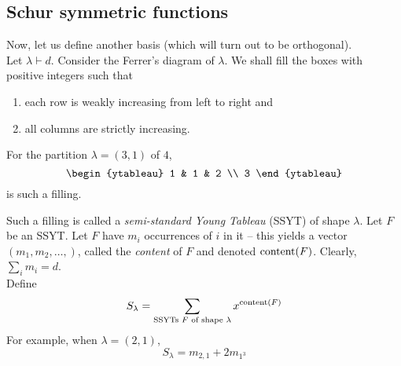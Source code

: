 \subsection{Schur symmetric functions}

	Now, let us define another basis (which will turn out to be orthogonal).\\

	Let $\lambda \vdash d$. Consider the Ferrer's diagram of $\lambda$. We shall fill the boxes with positive integers such that
	\begin{enumerate}
		\item each row is weakly increasing from left to right and
		\item all columns are strictly increasing.
	\end{enumerate}

	\begin{fex}
		For the partition $\lambda = (3,1)$ of $4$,
		\[
		\begin{ytableau}
			1 & 1 & 2 \\
			3
		\end{ytableau}
		\]
		is such a filling.
	\end{fex}
	Such a filling is called a \emph{semi-standard Young Tableau} (SSYT) of shape $\lambda$. Let $F$ be an SSYT. Let $F$ have $m_i$ occurrences of $i$ in it -- this yields a vector $(m_1,m_2,\ldots,)$, called the \emph{content} of $F$ and denoted $\operatorname{content}(F)$. Clearly, $\sum_i m_i = d$.\\
	Define
	\[ S_\lambda = \sum_{\text{SSYTs $F$ of shape $\lambda$}} x^{\operatorname{content}(F)} \]
	For example, when $\lambda = (2,1)$,
	\[ S_\lambda = m_{2,1} + 2 m_{1^3} \]

